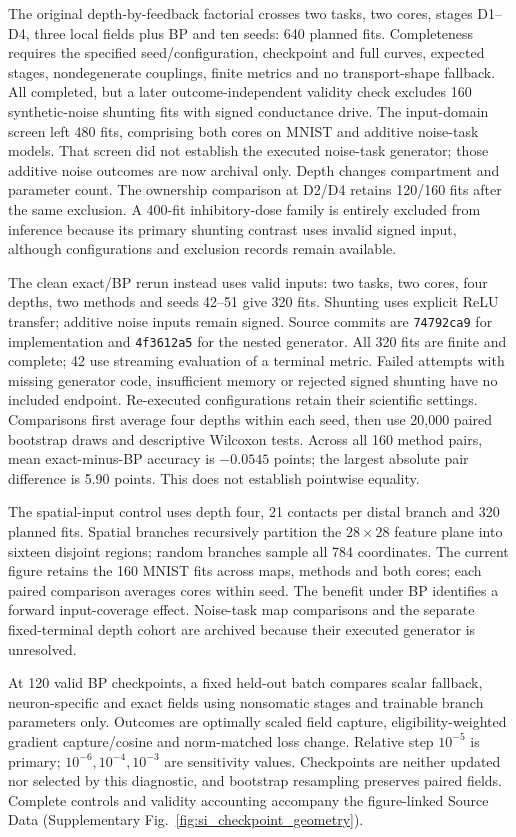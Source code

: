 The original depth-by-feedback factorial crosses two tasks, two cores, stages D1--D4, three local fields plus BP and ten seeds: 640 planned fits. Completeness requires the specified seed/configuration, checkpoint and full curves, expected stages, nondegenerate couplings, finite metrics and no transport-shape fallback. All completed, but a later outcome-independent validity check excludes 160 synthetic-noise shunting fits with signed conductance drive. The input-domain screen left 480 fits, comprising both cores on MNIST and additive noise-task models. That screen did not establish the executed noise-task generator; those additive noise outcomes are now archival only. Depth changes compartment and parameter count. The ownership comparison at D2/D4 retains 120/160 fits after the same exclusion. A 400-fit inhibitory-dose family is entirely excluded from inference because its primary shunting contrast uses invalid signed input, although configurations and exclusion records remain available.

The clean exact/BP rerun instead uses valid inputs: two tasks, two cores, four depths, two methods and seeds 42--51 give 320 fits. Shunting uses explicit ReLU transfer; additive noise inputs remain signed. Source commits are \texttt{74792ca9} for implementation and \texttt{4f3612a5} for the nested generator. All 320 fits are finite and complete; 42 use streaming evaluation of a terminal metric. Failed attempts with missing generator code, insufficient memory or rejected signed shunting have no included endpoint. Re-executed configurations retain their scientific settings. Comparisons first average four depths within each seed, then use 20,000 paired bootstrap draws and descriptive Wilcoxon tests. Across all 160 method pairs, mean exact-minus-BP accuracy is $-0.0545$ points; the largest absolute pair difference is 5.90 points. This does not establish pointwise equality.

The spatial-input control uses depth four, 21 contacts per distal branch and 320 planned fits. Spatial branches recursively partition the $28\times28$ feature plane into sixteen disjoint regions; random branches sample all 784 coordinates. The current figure retains the 160 MNIST fits across maps, methods and both cores; each paired comparison averages cores within seed. The benefit under BP identifies a forward input-coverage effect. Noise-task map comparisons and the separate fixed-terminal depth cohort are archived because their executed generator is unresolved.

At 120 valid BP checkpoints, a fixed held-out batch compares scalar fallback, neuron-specific and exact fields using nonsomatic stages and trainable branch parameters only. Outcomes are optimally scaled field capture, eligibility-weighted gradient capture/cosine and norm-matched loss change. Relative step $10^{-5}$ is primary; $10^{-6},10^{-4},10^{-3}$ are sensitivity values. Checkpoints are neither updated nor selected by this diagnostic, and bootstrap resampling preserves paired fields. Complete controls and validity accounting accompany the figure-linked Source Data (Supplementary Fig.~\ref{fig:si_checkpoint_geometry}).

